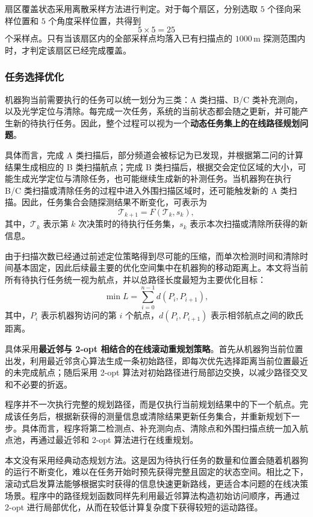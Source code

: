 \documentclass[withoutpreface,bwprint]{cumcmthesis}
\begin{document}
扇区覆盖状态采用离散采样方法进行判定。对于每个扇区，分别选取 $5$ 个径向采样位置和 $5$ 个角度采样位置，共得到
\[
5\times5=25
\]
个采样点。只有当该扇区内的全部采样点均落入已有扫描点的 $1000\,\mathrm{m}$ 探测范围内时，才判定该扇区已经完成覆盖。






\subsubsection{任务选择优化}

机器狗当前需要执行的任务可以统一划分为三类：A 类扫描、B/C 类补充测向，以及光学定位与清除。每完成一次任务，系统的当前状态都会随之更新，并可能产生新的待执行任务。因此，整个过程可以视为一个\textbf{动态任务集上的在线路径规划问题}。

具体而言，完成 A 类扫描后，部分频道会被标记为已发现，并根据第二问的计算结果生成相应的 B 类扫描航点；完成 B 类扫描后，根据交会定位区域的大小，可能生成光学定位与清除任务，也可能继续生成新的补测任务。当机器狗在执行 B/C 类扫描或清除任务的过程中进入外围扫描区域时，还可能触发新的 A 类扫描。因此，任务集合会随探测结果不断变化，可表示为
\[
\mathcal{T}_{k+1}
=
F\left(\mathcal{T}_k,s_k\right),
\]
其中，$\mathcal{T}_k$ 表示第 $k$ 次决策时的待执行任务集，$s_k$ 表示本次扫描或清除所获得的新信息。

由于扫描次数已经通过前述定位策略得到尽可能的压缩，而单次检测时间和清除时间基本固定，因此后续最主要的优化空间集中在机器狗的移动距离上。本文将当前所有待执行任务统一视为航点，并以总路径长度最短为主要优化目标：
\[
\min L
=
\sum_{i=0}^{n-1}
d\left(P_i,P_{i+1}\right),
\]
其中，$P_i$ 表示机器狗访问的第 $i$ 个航点，$d(P_i,P_{i+1})$ 表示相邻航点之间的欧氏距离。

具体采用\textbf{最近邻与 2-opt 相结合的在线滚动重规划策略}。首先从机器狗当前位置出发，利用最近邻贪心算法生成一条初始路径，即每次优先选择距离当前位置最近的未完成航点；随后采用 2-opt 算法对初始路径进行局部边交换，以减少路径交叉和不必要的折返。

程序并不一次执行完整的规划路径，而是仅执行当前规划结果中的下一个航点。完成该任务后，根据新获得的测量信息或清除结果更新任务集合，并重新规划下一步。具体而言，程序将第二检测点、补充测向点、清除点和外围扫描点统一加入航点池，再通过最近邻和 2-opt 算法进行在线重规划。

本文没有采用经典动态规划方法。这是因为待执行任务的数量和位置会随着机器狗的运行不断变化，难以在任务开始时预先获得完整且固定的状态空间。相比之下，滚动式启发算法能够根据实时获得的信息快速更新路线，更适合本问题的在线决策场景。程序中的路径规划函数同样先利用最近邻算法构造初始访问顺序，再通过 2-opt 进行局部优化，从而在较低计算复杂度下获得较短的运动路径。
\end{document}
